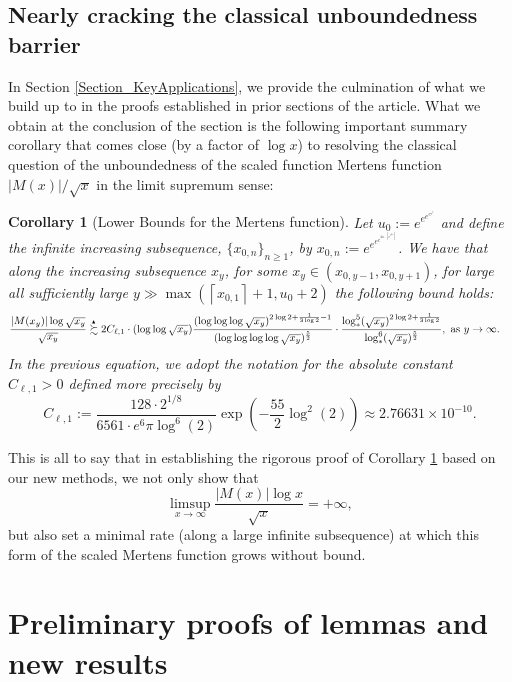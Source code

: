 \documentclass[11pt,reqno,a4letter]{article}
\numberwithin{figure}{section}
\numberwithin{table}{section}
\newcommand{\ceiling}[1]{\left\lceil #1 \right\rceil}
\theoremstyle{plain}
\newtheorem{cor}[theorem]{Corollary}
\numberwithin{theorem}{section}
\theoremstyle{definition}
\newcommand{\SuccSim}[0]{\overset{_{\scriptsize{\blacktriangle}}}{\succsim}}
\begin{document}
\subsection{Nearly cracking the classical unboundedness barrier} 

In Section \ref{Section_KeyApplications}, 
we provide the culmination of what we build up to in the proofs established in 
prior sections of the article. 
What we obtain at the conclusion of the section 
is the following important summary corollary that comes close 
(by a factor of $\log x$) to resolving the classical question of the 
unboundedness of the scaled function Mertens function 
$|M(x)| / \sqrt{x}$ in the limit supremum sense: 

\begin{cor}[Lower Bounds for the Mertens function] 
\label{cor_ThePipeDreamResult_v1} 
Let $u_0 := e^{e^{e^{e^{e^{e}}}}}$ and define the infinite increasing subsequence, 
$\{x_{0,n}\}_{n \geq 1}$, by $x_{0,n} := e^{e^{e^{e^{4n \cdot \ceiling{e^{e^{4n}}}}}}}$. 
We have that along the increasing subsequence $x_y$, for some 
$x_y \in \left(x_{0,y-1}, x_{0,y+1}\right)$, for large all sufficiently large 
$y \gg \max\left(\ceiling{x_{0,1}}+1, u_0+2\right)$ the following bound holds: 
\begin{align*} 
\frac{|M(x_y)| \log \sqrt{x_y}}{\sqrt{x_y}} & \SuccSim 
     2C_{\ell,1} \cdot (\log\log \sqrt{x_y}) 
     \frac{(\log\log\log \sqrt{x_y})^{2\log 2+\frac{1}{3\log 2} - 1}}{ 
     (\log\log\log\log \sqrt{x_y})^{\frac{5}{2}}} \cdot 
     \frac{\log_{\ast}^5(\sqrt{x_y})^{2\log 2 + \frac{1}{3\log 2}}}{ 
     \log_{\ast}^{6}(\sqrt{x_y})^{\frac{5}{2}}}, \mathrm{\ as\ } y \rightarrow \infty. 
\end{align*} 
In the previous equation, we adopt the notation for the 
absolute constant $C_{\ell,1} > 0$ defined more precisely by 
\[
C_{\ell,1} := \frac{128 \cdot 2^{1/8}}{6561 \cdot e^6 \pi \log^6(2)} 
     \exp\left(-\frac{55}{2} \log^2(2)\right) 
     \approx 2.76631 \times 10^{-10}. 
\]
\end{cor} 

This is all to say that in establishing the rigorous proof of 
Corollary \ref{cor_ThePipeDreamResult_v1} 
based on our new methods, we not only show that 
\[
\limsup_{x \rightarrow \infty} \frac{|M(x)| \log x}{\sqrt{x}} = +\infty, 
\]
but also set a minimal rate (along a large infinite subsequence) at which this form of the 
scaled Mertens function grows without bound. 

\newpage 
\section{Preliminary proofs of lemmas and new results} 
\label{Section_PrelimProofs_Config} 
\end{document}

